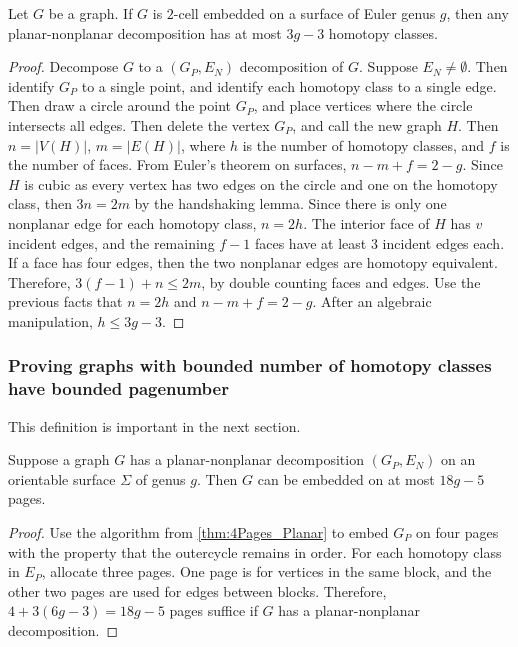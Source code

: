 \begin{lemma}
	Let $G$ be a graph. If \(G\) is \(2\)-cell embedded on a surface of Euler genus \(g\), then any planar-nonplanar decomposition has at most \(3g-3\) homotopy classes.
\end{lemma}
\begin{proof}
	Decompose \(G\) to a \((G_P, E_N)\) decomposition of \(G\). Suppose \(E_N \neq \emptyset\). Then identify \(G_P\) to a single point, and identify each homotopy class to a single edge. Then draw a circle around the point \(G_P\), and place vertices where the circle intersects all edges. Then delete the vertex \(G_P\), and call the new graph \(H\). Then \(n = |V(H)|\), \(m = |E(H)|\), where \(h\) is the number of homotopy classes, and \(f\) is the number of faces. From Euler's theorem on surfaces, \(n - m + f = 2 - g\). Since \(H\) is cubic as every vertex has two edges on the circle and one on the homotopy class, then \(3n = 2m\) by the handshaking lemma. Since there is only one nonplanar edge for each homotopy class, \(n = 2h\). The interior face of \(H\) has \(v\) incident edges, and the remaining \(f-1\) faces have at least 3 incident edges each. If a face has four edges, then the two nonplanar edges are homotopy equivalent. Therefore, \(3(f-1) + n \leq 2m\), by double counting faces and edges. Use the previous facts that $n = 2h$ and $n - m + f = 2 - g$. After an algebraic manipulation, \(h \leq 3g - 3 \). 
\end{proof}

\subsubsection{Proving graphs with bounded number of homotopy classes have bounded pagenumber}\label{sssec:bounded_pagenumber_homotopy}
This definition is important in the next section.
\begin{lemma}\label{lem:planar_nonplanar_orientable}
	Suppose a graph \(G\) has a planar-nonplanar decomposition \((G_P, E_N)\) on an orientable surface \(\Sigma\) of genus $g$. Then \(G\) can be embedded on at most \(18g - 5\) pages.
\end{lemma}
\begin{proof}
	Use the algorithm from \cref{thm:4Pages_Planar} to embed $G_P$ on four pages with the property that the outercycle remains in order. For each homotopy class in \(E_P\), allocate three pages. One page is for vertices in the same block, and the other two pages are used for edges between blocks. Therefore, \(4 + 3(6g - 3) = 18g-5\) pages suffice if \(G\) has a planar-nonplanar decomposition.
\end{proof}